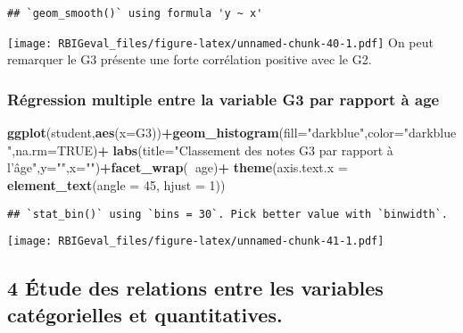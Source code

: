 \documentclass[
]{article}
\newenvironment{Shaded}{\begin{snugshade}}{\end{snugshade}}
\newcommand{\DataTypeTok}[1]{\textcolor[rgb]{0.13,0.29,0.53}{#1}}
\newcommand{\DecValTok}[1]{\textcolor[rgb]{0.00,0.00,0.81}{#1}}
\newcommand{\KeywordTok}[1]{\textcolor[rgb]{0.13,0.29,0.53}{\textbf{#1}}}
\newcommand{\NormalTok}[1]{#1}
\newcommand{\OperatorTok}[1]{\textcolor[rgb]{0.81,0.36,0.00}{\textbf{#1}}}
\newcommand{\OtherTok}[1]{\textcolor[rgb]{0.56,0.35,0.01}{#1}}
\newcommand{\StringTok}[1]{\textcolor[rgb]{0.31,0.60,0.02}{#1}}
\begin{document}
\begin{verbatim}
## `geom_smooth()` using formula 'y ~ x'
\end{verbatim}

\texttt{[image: RBIGeval\_files/figure-latex/unnamed-chunk-40-1.pdf]} On
peut remarquer le G3 présente une forte corrélation positive avec le G2.

\hypertarget{ruxe9gression-multiple-entre-la-variable-g3-par-rapport-uxe0-age}{%
\subsubsection{Régression multiple entre la variable G3 par rapport à
age}\label{ruxe9gression-multiple-entre-la-variable-g3-par-rapport-uxe0-age}}

\begin{Shaded}
\begin{Highlighting}[]
\KeywordTok{ggplot}\NormalTok{(student,}\KeywordTok{aes}\NormalTok{(}\DataTypeTok{x=}\NormalTok{G3))}\OperatorTok{+}\KeywordTok{geom_histogram}\NormalTok{(}\DataTypeTok{fill=}\StringTok{"darkblue"}\NormalTok{,}\DataTypeTok{color=}\StringTok{"darkblue"}\NormalTok{,}\DataTypeTok{na.rm=}\OtherTok{TRUE}\NormalTok{)}\OperatorTok{+}
\StringTok{    }\KeywordTok{labs}\NormalTok{(}\DataTypeTok{title=}\StringTok{"Classement des notes G3 par rapport à l'âge"}\NormalTok{,}\DataTypeTok{y=}\StringTok{""}\NormalTok{,}\DataTypeTok{x=}\StringTok{""}\NormalTok{)}\OperatorTok{+}\KeywordTok{facet_wrap}\NormalTok{(}\OperatorTok{~}\NormalTok{age)}\OperatorTok{+}
\StringTok{  }\KeywordTok{theme}\NormalTok{(}\DataTypeTok{axis.text.x =} \KeywordTok{element_text}\NormalTok{(}\DataTypeTok{angle =} \DecValTok{45}\NormalTok{, }\DataTypeTok{hjust =} \DecValTok{1}\NormalTok{))}
\end{Highlighting}
\end{Shaded}

\begin{verbatim}
## `stat_bin()` using `bins = 30`. Pick better value with `binwidth`.
\end{verbatim}

\texttt{[image: RBIGeval\_files/figure-latex/unnamed-chunk-41-1.pdf]}

\hypertarget{uxe9tude-des-relations-entre-les-variables-catuxe9gorielles-et-quantitatives.}{%
\subsection{4 Étude des relations entre les variables catégorielles et
quantitatives.}\label{uxe9tude-des-relations-entre-les-variables-catuxe9gorielles-et-quantitatives.}}
\end{document}
